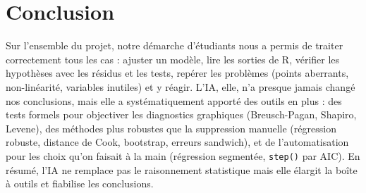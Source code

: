 \documentclass[11pt,a4paper]{article}
\begin{document}
\newpage
\section*{Conclusion}

Sur l'ensemble du projet, notre démarche d'étudiants nous a permis de traiter correctement tous les cas : ajuster un modèle, lire les sorties de R, vérifier les hypothèses avec les résidus et les tests, repérer les problèmes (points aberrants, non-linéarité, variables inutiles) et y réagir. L'IA, elle, n'a presque jamais changé nos conclusions, mais elle a systématiquement apporté des outils en plus : des tests formels pour objectiver les diagnostics graphiques (Breusch-Pagan, Shapiro, Levene), des méthodes plus robustes que la suppression manuelle (régression robuste, distance de Cook, bootstrap, erreurs sandwich), et de l'automatisation pour les choix qu'on faisait à la main (régression segmentée, \texttt{step()} par AIC). En résumé, l'IA ne remplace pas le raisonnement statistique mais elle élargit la boîte à outils et fiabilise les conclusions.
\end{document}
